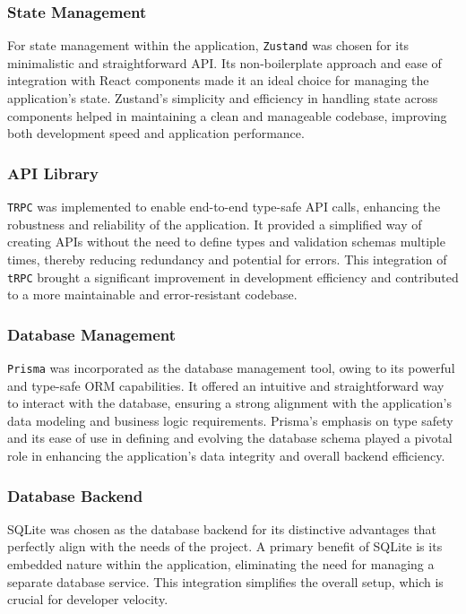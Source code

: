 \subsubsection{State Management}

For state management within the application, \texttt{Zustand} was chosen for its minimalistic and straightforward API. Its non-boilerplate approach and ease of integration with React components made it an ideal choice for managing the application's state.\cite{why-zustand} Zustand's simplicity and efficiency in handling state across components helped in maintaining a clean and manageable codebase, improving both development speed and application performance.

\subsubsection{API Library}

\texttt{TRPC} was implemented to enable end-to-end type-safe API calls, enhancing the robustness and reliability of the application. It provided a simplified way of creating APIs without the need to define types and validation schemas multiple times, thereby reducing redundancy and potential for errors. This integration of \texttt{tRPC} brought a significant improvement in development efficiency and contributed to a more maintainable and error-resistant codebase.

\subsubsection{Database Management}

\texttt{Prisma} was incorporated as the database management tool, owing to its powerful and type-safe ORM capabilities. It offered an intuitive and straightforward way to interact with the database, ensuring a strong alignment with the application's data modeling and business logic requirements.\cite{why-prisma} Prisma's emphasis on type safety and its ease of use in defining and evolving the database schema played a pivotal role in enhancing the application's data integrity and overall backend efficiency.


\subsubsection{Database Backend}

SQLite was chosen as the database backend for its distinctive advantages that perfectly align with the needs of the project. A primary benefit of SQLite is its embedded nature within the application, eliminating the need for managing a separate database service. This integration simplifies the overall setup, which is crucial for developer velocity.

